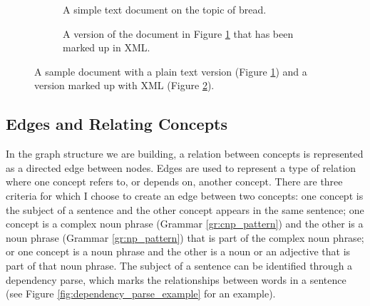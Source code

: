 \documentclass[12pt]{article}
\theoremstyle{grammarstyle}
\begin{document}
\begin{figure}
    \centering
    
    \begin{subfigure}{\linewidth}
        \lstset{breaklines=true, numbers=none, breakindent=0mm}
        
        \caption{A simple text document on the topic of bread.}
        \label{fig:sample_txt_document}
    \end{subfigure}
    
    \vspace{5mm}
    
    \begin{subfigure}{\linewidth}
        \centering
        
        \caption{A version of the document in Figure \ref{fig:sample_txt_document} that has been marked up in XML.}
        \label{fig:sample_xml_document}
    \end{subfigure}
    
    \caption{A sample document with a plain text version (Figure \ref{fig:sample_txt_document}) and a version marked up with XML (Figure \ref{fig:sample_xml_document}).}
    \label{fig:sample document}
\end{figure}

\subsection{Edges and Relating Concepts}
In the graph structure we are building, a relation between concepts is represented as a directed edge between nodes. Edges are used to represent a type of relation where one concept refers to, or depends on, another concept. There are three criteria for which I choose to create an edge between two concepts: one concept is the subject of a sentence and the other concept appears in the same sentence; one concept is a complex noun phrase (Grammar \ref{gr:cnp_pattern}) and the other is a noun phrase (Grammar \ref{gr:np_pattern}) that is part of the complex noun phrase; or one concept is a noun phrase and the other is a noun or an adjective that is part of that noun phrase. The subject of a sentence can be identified through a dependency parse, which marks the relationships between words in a sentence (see Figure \ref{fig:dependency_parse_example} for an example). 
\end{document}

